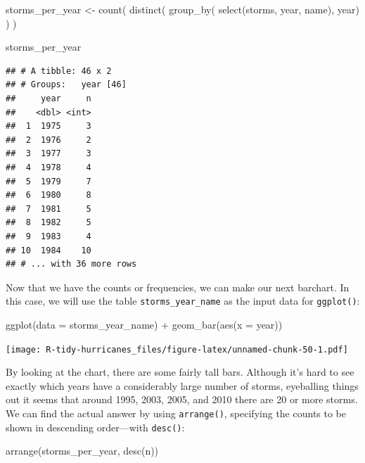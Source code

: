 \documentclass[
]{book}
\newenvironment{Shaded}{\begin{snugshade}}{\end{snugshade}}
\newcommand{\AttributeTok}[1]{\textcolor[rgb]{0.77,0.63,0.00}{#1}}
\newcommand{\FunctionTok}[1]{\textcolor[rgb]{0.00,0.00,0.00}{#1}}
\newcommand{\NormalTok}[1]{#1}
\newcommand{\OtherTok}[1]{\textcolor[rgb]{0.56,0.35,0.01}{#1}}
\newcommand{\SpecialCharTok}[1]{\textcolor[rgb]{0.00,0.00,0.00}{#1}}
\begin{document}
\begin{Shaded}
\begin{Highlighting}[]
\NormalTok{storms\_per\_year }\OtherTok{\textless{}{-}} \FunctionTok{count}\NormalTok{(}
  \FunctionTok{distinct}\NormalTok{(}
    \FunctionTok{group\_by}\NormalTok{(}
      \FunctionTok{select}\NormalTok{(storms, year, name), }
\NormalTok{      year)}
\NormalTok{    )}
\NormalTok{  )}

\NormalTok{storms\_per\_year}
\end{Highlighting}
\end{Shaded}

\begin{verbatim}
## # A tibble: 46 x 2
## # Groups:   year [46]
##     year     n
##    <dbl> <int>
##  1  1975     3
##  2  1976     2
##  3  1977     3
##  4  1978     4
##  5  1979     7
##  6  1980     8
##  7  1981     5
##  8  1982     5
##  9  1983     4
## 10  1984    10
## # ... with 36 more rows
\end{verbatim}

Now that we have the counts or frequencies, we can make our next barchart.
In this case, we will use the table \texttt{storms\_year\_name} as the input data for
\texttt{ggplot()}:

\begin{Shaded}
\begin{Highlighting}[]
\FunctionTok{ggplot}\NormalTok{(}\AttributeTok{data =}\NormalTok{ storms\_year\_name) }\SpecialCharTok{+} 
  \FunctionTok{geom\_bar}\NormalTok{(}\FunctionTok{aes}\NormalTok{(}\AttributeTok{x =}\NormalTok{ year))}
\end{Highlighting}
\end{Shaded}

\texttt{[image: R-tidy-hurricanes\_files/figure-latex/unnamed-chunk-50-1.pdf]}

By looking at the chart, there are some fairly tall bars. Although it's hard
to see exactly which years have a considerably large number of storms,
eyeballing things out it seems that around 1995, 2003, 2005, and 2010 there are
20 or more storms. We can find the actual answer by using \texttt{arrange()},
specifying the counts to be shown in descending order---with \texttt{desc()}:

\begin{Shaded}
\begin{Highlighting}[]
\FunctionTok{arrange}\NormalTok{(storms\_per\_year, }\FunctionTok{desc}\NormalTok{(n))}
\end{Highlighting}
\end{Shaded}
\end{document}
